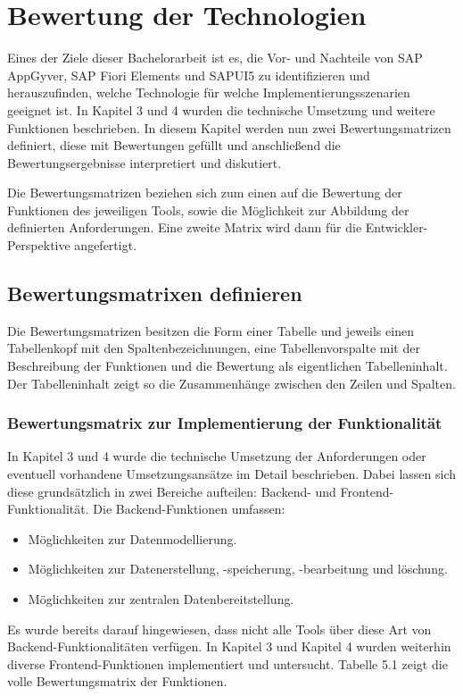 
\chapter{Bewertung der Technologien} \label{EV}

Eines der Ziele dieser Bachelorarbeit ist es, die Vor- und Nachteile von SAP AppGyver, SAP Fiori Elements und SAPUI5 zu identifizieren und herauszufinden, welche Technologie für welche Implementierungsszenarien geeignet ist. In Kapitel 3 und 4 wurden die technische Umsetzung und weitere Funktionen beschrieben. In diesem Kapitel werden nun zwei Bewertungsmatrizen definiert, diese mit Bewertungen gefüllt und anschließend die Bewertungsergebnisse interpretiert und diskutiert.

Die Bewertungsmatrizen beziehen sich zum einen auf die Bewertung der Funktionen des jeweiligen Tools, sowie die Möglichkeit zur Abbildung der definierten Anforderungen. Eine zweite Matrix wird dann für die Entwickler-Perspektive angefertigt.

\section{Bewertungsmatrixen definieren}
Die Bewertungsmatrizen besitzen die Form einer Tabelle \cite{wi:ma} und jeweils einen Tabellenkopf mit den Spaltenbezeichnungen, eine Tabellenvorspalte mit der Beschreibung der Funktionen und die Bewertung als eigentlichen Tabelleninhalt. Der Tabelleninhalt zeigt so die Zusammenhänge zwischen den Zeilen und Spalten. \cite{wi:ta} 

\subsection{Bewertungsmatrix zur Implementierung der Funktionalität}
In Kapitel 3 und 4 wurde die technische Umsetzung der Anforderungen oder eventuell vorhandene Umsetzungsansätze im Detail beschrieben. Dabei lassen sich diese grundsätzlich in zwei Bereiche aufteilen: Backend- und Frontend-Funktionalität. 
Die Backend-Funktionen umfassen:
\begin{itemize}[noitemsep]
\item Möglichkeiten zur Datenmodellierung.
\item Möglichkeiten zur Datenerstellung, -speicherung, -bearbeitung und löschung.
\item Möglichkeiten zur zentralen Datenbereitstellung.
\end{itemize}
Es wurde bereits darauf hingewiesen, dass nicht alle Tools über diese Art von Backend-Funktionalitäten verfügen.
In Kapitel 3 und Kapitel 4 wurden weiterhin diverse Frontend-Funktionen implementiert und untersucht. Tabelle 5.1 zeigt die volle Bewertungsmatrix der Funktionen.

